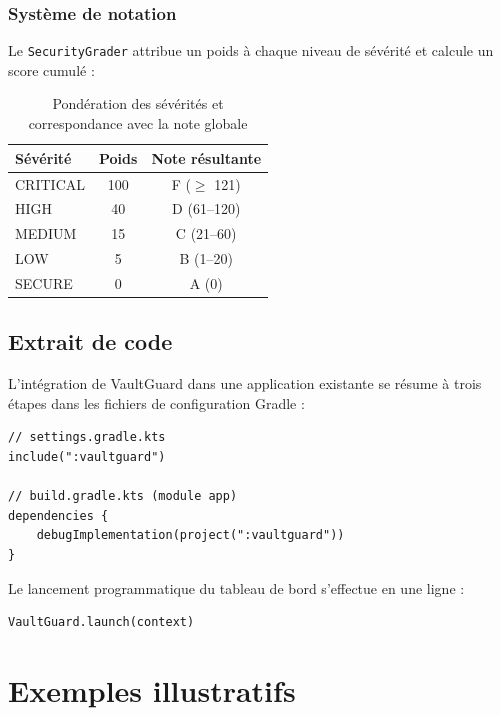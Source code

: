 \documentclass[preprint,12pt, a4paper]{elsarticle}
\begin{document}
\subsubsection{Système de notation}

Le \texttt{SecurityGrader} attribue un poids à chaque niveau de sévérité et calcule un score cumulé :

\begin{table}[h]
\centering
\begin{tabular}{|l|c|c|}
\hline
\textbf{Sévérité} & \textbf{Poids} & \textbf{Note résultante} \\
\hline
CRITICAL & 100 & F ($\geq$ 121) \\
HIGH & 40 & D (61--120) \\
MEDIUM & 15 & C (21--60) \\
LOW & 5 & B (1--20) \\
SECURE & 0 & A (0) \\
\hline
\end{tabular}
\caption{Pondération des sévérités et correspondance avec la note globale}
\label{tab:grading}
\end{table}

\subsection{Extrait de code}

L'intégration de VaultGuard dans une application existante se résume à trois étapes dans les fichiers de configuration Gradle :

\begin{lstlisting}[style=kotlin, caption={Intégration de VaultGuard}]
// settings.gradle.kts
include(":vaultguard")

// build.gradle.kts (module app)
dependencies {
    debugImplementation(project(":vaultguard"))
}
\end{lstlisting}

Le lancement programmatique du tableau de bord s'effectue en une ligne :

\begin{lstlisting}[style=kotlin, caption={Lancement du tableau de bord}]
VaultGuard.launch(context)
\end{lstlisting}


\section{Exemples illustratifs}
\end{document}
